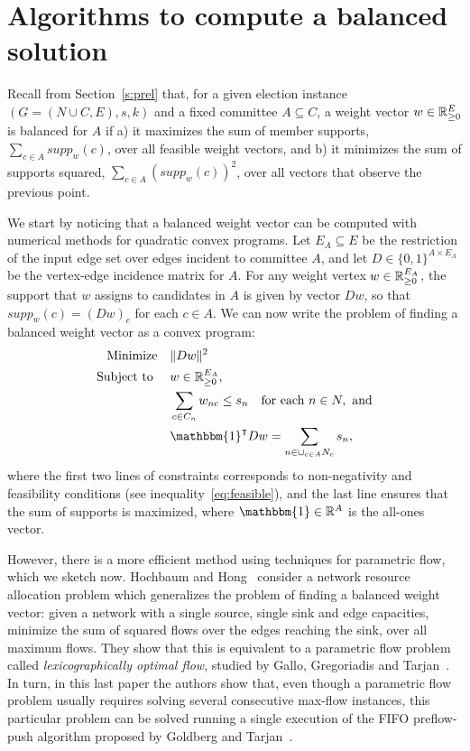 \section{Algorithms to compute a balanced solution} \label{s:balanced}

Recall from Section~\ref{s:prel} that, for a given election instance $(G = (N \cup C, E), s, k)$ and a fixed committee $A\subseteq C$, a weight vector $w\in \mathbb{R}_{\geq 0}^E$ is balanced for $A$ if a) it maximizes the sum of member supports, $\sum_{c\in A} supp_w(c)$, over all feasible weight vectors, and b) it minimizes the sum of supports squared, $\sum_{c\in A} (supp_w(c))^2$, over all vectors that observe the previous point. 

We start by noticing that a balanced weight vector can be computed with numerical methods for quadratic convex programs. 
Let $E_A\subseteq E$ be the restriction of the input edge set over edges incident to committee $A$, and let $D\in\{0,1\}^{A\times E_A}$ be the vertex-edge incidence matrix for $A$. 
For any weight vertex $w\in\mathbb{R}_{\geq 0}^{E_A}$, the support that $w$ assigns to candidates in $A$ is given by vector $Dw$, so that $supp_w(c)=(Dw)_c$ for each $c\in A$. 
We can now write the problem of finding a balanced weight vector as a convex program:
\begin{align*}
    \text{Minimize} \quad & \|Dw\|^2 \\
    \text{Subject to } \quad & w\in\R^{E_A}, \\
    & \sum_{c\in C_n} w_{nc} \leq s_n \quad \text{for each } n\in N, \text{ and} \\
    & \mathbbm{1}^{\intercal} Dw = \sum_{n\in \cup_{c\in A} N_c} s_n,
\end{align*}
where the first two lines of constraints corresponds to non-negativity and feasibility conditions (see inequality~\ref{eq:feasible}), and the last line ensures that the sum of supports is maximized, where $\mathbbm{1}\in\mathbb{R}^A$ is the all-ones vector. 



However, there is a more efficient method using techniques for parametric flow, which we sketch now. Hochbaum and Hong~\cite[Section 6]{hochbaum1995strongly} consider a network resource allocation problem which generalizes the problem of finding a balanced weight vector: given a network with a single source, single sink and edge capacities, minimize the sum of squared flows over the edges reaching the sink, over all maximum flows. 
They show that this is equivalent to a parametric flow problem called \emph{lexicographically optimal flow}, studied by Gallo, Gregoriadis and Tarjan~\cite{gallo1989fast}. 
In turn, in this last paper the authors show that, even though a parametric flow problem usually requires solving several consecutive max-flow instances, this particular problem can be solved running a single execution of the FIFO preflow-push algorithm proposed by Goldberg and Tarjan~\cite{goldberg1988new}.

